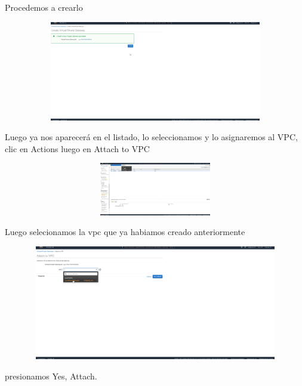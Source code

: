 \documentclass{article} %
\begin{document}
\noindent 

\noindent 

\noindent 

\noindent 

\noindent Procedemos a crearlo

\noindent 

\noindent \includegraphics*[width=5.45in, height=1.72in, trim=0.00in 4.23in 7.67in 0.00in]{image11}

\noindent Luego ya nos aparecer\'{a} en el listado, lo seleccionamos y lo asignaremos al VPC, clic en Actions luego en Attach to VPC

\noindent 

\noindent 

\noindent \includegraphics*[width=5.72in, height=0.91in, trim=0.96in 4.21in 4.81in 0.12in]{image12}

\noindent Luego selecionamos la vpc que ya habiamos creado anteriormente  

\noindent 

\noindent \includegraphics*[width=5.60in, height=1.97in, trim=0.00in 2.94in 4.79in 0.00in]{image13}

\noindent 

\noindent presionamos Yes, Attach. 

\noindent 
\end{document}
